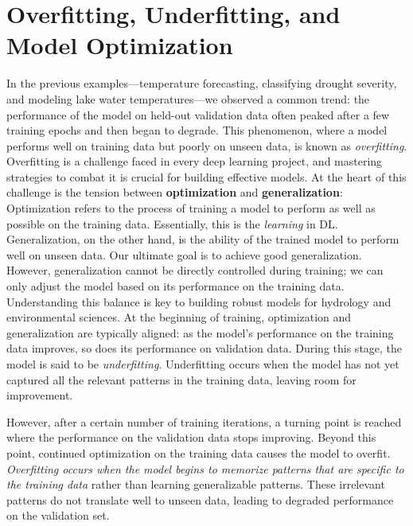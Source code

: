 
\section{Overfitting, Underfitting, and Model Optimization}
\label{sc:overfitting}
In the previous examples—temperature forecasting, classifying drought severity, and modeling lake water temperatures—we observed a common trend: the performance of the model on held-out validation data often peaked after a few training epochs and then began to degrade. This phenomenon, where a model performs well on training data but poorly on unseen data, is known as \textit{overfitting}. Overfitting is a challenge faced in every deep learning project, and mastering strategies to combat it is crucial for building effective models.
At the heart of this challenge is the tension between \textbf{optimization} and \textbf{generalization}:
Optimization refers to the process of training a model to perform as well as possible on the training data. Essentially, this is the \textit{learning} in DL. Generalization, on the other hand, is the ability of the trained model to perform well on unseen data.
Our ultimate goal is to achieve good generalization. However, generalization cannot be directly controlled during training; we can only adjust the model based on its performance on the training data. Understanding this balance is key to building robust models for hydrology and environmental sciences.
At the beginning of training, optimization and generalization are typically aligned: as the model's performance on the training data improves, so does its performance on validation data. During this stage, the model is said to be \textit{underfitting}. Underfitting occurs when the model has not yet captured all the relevant patterns in the training data, leaving room for improvement.

However, after a certain number of training iterations, a turning point is reached where the performance on the validation data stops improving. Beyond this point, continued optimization on the training data causes the model to overfit. \textit{Overfitting occurs when the model begins to memorize patterns that are specific to the training data} rather than learning generalizable patterns. These irrelevant patterns do not translate well to unseen data, leading to degraded performance on the validation set.

